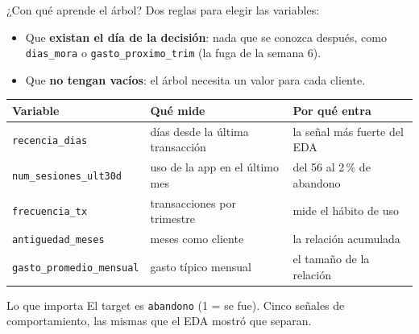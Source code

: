 \documentclass{beamer}
\begin{document}
\begin{frame}{¿Con qué aprende el árbol?}
\small
Dos reglas para elegir las variables:
\begin{itemize} \setlength{\itemsep}{0.06cm}
  \item Que \textbf{existan el día de la decisión}: nada que se conozca después, como \texttt{dias\_mora} o \texttt{gasto\_proximo\_trim} (la fuga de la semana 6).
  \item Que \textbf{no tengan vacíos}: el árbol necesita un valor para cada cliente.
\end{itemize}

\vspace{0.15cm}
\begin{center}
\scriptsize
\setlength{\tabcolsep}{5pt}
\begin{tabular}{@{}l l l@{}}
\toprule
\textbf{Variable} & \textbf{Qué mide} & \textbf{Por qué entra} \\
\midrule
\texttt{recencia\_dias} & días desde la última transacción & la señal más fuerte del EDA \\
\texttt{num\_sesiones\_ult30d} & uso de la app en el último mes & del 56 al 2\,\% de abandono \\
\texttt{frecuencia\_tx} & transacciones por trimestre & mide el hábito de uso \\
\texttt{antiguedad\_meses} & meses como cliente & la relación acumulada \\
\texttt{gasto\_promedio\_mensual} & gasto típico mensual & el tamaño de la relación \\
\bottomrule
\end{tabular}
\end{center}

\vspace{0.1cm}
\begin{alertblock}{Lo que importa}
El target es \texttt{abandono} (1 = se fue). Cinco señales de comportamiento, las mismas que el EDA mostró que separan.
\end{alertblock}
\end{frame}
\end{document}
